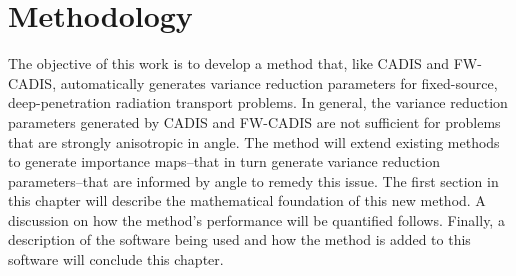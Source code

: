 \chapter{Methodology}

The objective of this work is to develop a method that, like CADIS and FW-CADIS,
automatically generates variance reduction parameters for fixed-source,
deep-penetration radiation transport problems. In general, the variance reduction
parameters generated by CADIS and FW-CADIS are not sufficient for
problems that are strongly
anisotropic in angle. The method will extend existing
methods to generate importance maps--that in turn generate variance reduction
parameters--that are informed by angle to remedy this issue. The first section
in this chapter will describe
the mathematical foundation of this new method. A discussion on how
the method's performance will be quantified follows. Finally, a description of
the software being used and how the method is added to this software will
conclude this chapter.




